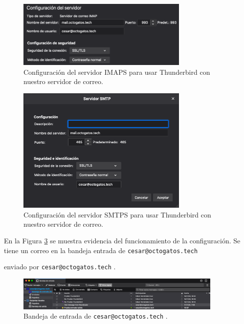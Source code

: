 \documentclass{article}
\newcommand{\ttt}[1]{%
\texttt{#1}%
}
\begin{document}
\begin{figure}[H]
  \centering
  \includegraphics[width=0.75\textwidth]{email/tbirdin}
  \caption{Configuraci\'on del servidor IMAPS para
           usar Thunderbird con nuestro servidor de correo.}
  \label{fig:email-tbirdin}
\end{figure}

\begin{figure}[H]
  \centering
  \includegraphics[width=0.75\textwidth]{email/tbirdout}
  \caption{Configuraci\'on del servidor SMTPS para
           usar Thunderbird con nuestro servidor de correo.}
  \label{fig:email-tbirdout}
\end{figure}

En la Figura \ref{fig:email-tbird} se muestra evidencia
del funcionamiento de la configuraci\'on.   Se tiene un
correo en la bandeja entrada de \ttt{cesar@octogatos.tech}
enviado por \ttt{cesar@octogatos.tech}.

\begin{figure}[H]
  \centering
  \includegraphics[width=0.9\textwidth]{email/tbird}
  \caption{Bandeja de entrada de \ttt{cesar@octogatos.tech}.}
  \label{fig:email-tbird}
\end{figure}
\end{document}
